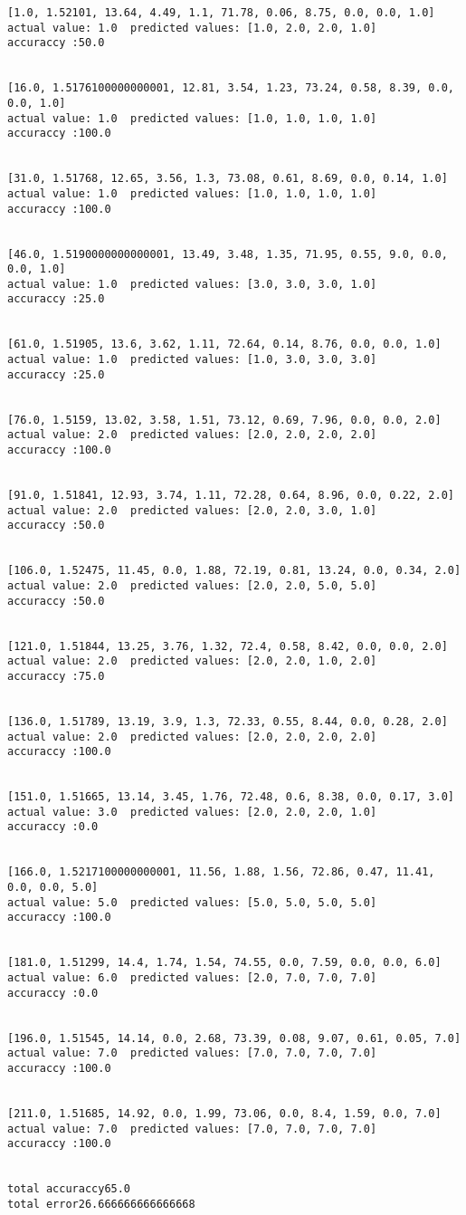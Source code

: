 \documentclass[11pt]{article}
\begin{document}
    \begin{Verbatim}[commandchars=\\\{\}]
[1.0, 1.52101, 13.64, 4.49, 1.1, 71.78, 0.06, 8.75, 0.0, 0.0, 1.0]
actual value: 1.0  predicted values: [1.0, 2.0, 2.0, 1.0]
accuraccy :50.0


[16.0, 1.5176100000000001, 12.81, 3.54, 1.23, 73.24, 0.58, 8.39, 0.0, 0.0, 1.0]
actual value: 1.0  predicted values: [1.0, 1.0, 1.0, 1.0]
accuraccy :100.0


[31.0, 1.51768, 12.65, 3.56, 1.3, 73.08, 0.61, 8.69, 0.0, 0.14, 1.0]
actual value: 1.0  predicted values: [1.0, 1.0, 1.0, 1.0]
accuraccy :100.0


[46.0, 1.5190000000000001, 13.49, 3.48, 1.35, 71.95, 0.55, 9.0, 0.0, 0.0, 1.0]
actual value: 1.0  predicted values: [3.0, 3.0, 3.0, 1.0]
accuraccy :25.0


[61.0, 1.51905, 13.6, 3.62, 1.11, 72.64, 0.14, 8.76, 0.0, 0.0, 1.0]
actual value: 1.0  predicted values: [1.0, 3.0, 3.0, 3.0]
accuraccy :25.0


[76.0, 1.5159, 13.02, 3.58, 1.51, 73.12, 0.69, 7.96, 0.0, 0.0, 2.0]
actual value: 2.0  predicted values: [2.0, 2.0, 2.0, 2.0]
accuraccy :100.0


[91.0, 1.51841, 12.93, 3.74, 1.11, 72.28, 0.64, 8.96, 0.0, 0.22, 2.0]
actual value: 2.0  predicted values: [2.0, 2.0, 3.0, 1.0]
accuraccy :50.0


[106.0, 1.52475, 11.45, 0.0, 1.88, 72.19, 0.81, 13.24, 0.0, 0.34, 2.0]
actual value: 2.0  predicted values: [2.0, 2.0, 5.0, 5.0]
accuraccy :50.0


[121.0, 1.51844, 13.25, 3.76, 1.32, 72.4, 0.58, 8.42, 0.0, 0.0, 2.0]
actual value: 2.0  predicted values: [2.0, 2.0, 1.0, 2.0]
accuraccy :75.0


[136.0, 1.51789, 13.19, 3.9, 1.3, 72.33, 0.55, 8.44, 0.0, 0.28, 2.0]
actual value: 2.0  predicted values: [2.0, 2.0, 2.0, 2.0]
accuraccy :100.0


[151.0, 1.51665, 13.14, 3.45, 1.76, 72.48, 0.6, 8.38, 0.0, 0.17, 3.0]
actual value: 3.0  predicted values: [2.0, 2.0, 2.0, 1.0]
accuraccy :0.0


[166.0, 1.5217100000000001, 11.56, 1.88, 1.56, 72.86, 0.47, 11.41, 0.0, 0.0, 5.0]
actual value: 5.0  predicted values: [5.0, 5.0, 5.0, 5.0]
accuraccy :100.0


[181.0, 1.51299, 14.4, 1.74, 1.54, 74.55, 0.0, 7.59, 0.0, 0.0, 6.0]
actual value: 6.0  predicted values: [2.0, 7.0, 7.0, 7.0]
accuraccy :0.0


[196.0, 1.51545, 14.14, 0.0, 2.68, 73.39, 0.08, 9.07, 0.61, 0.05, 7.0]
actual value: 7.0  predicted values: [7.0, 7.0, 7.0, 7.0]
accuraccy :100.0


[211.0, 1.51685, 14.92, 0.0, 1.99, 73.06, 0.0, 8.4, 1.59, 0.0, 7.0]
actual value: 7.0  predicted values: [7.0, 7.0, 7.0, 7.0]
accuraccy :100.0


total accuraccy65.0
total error26.666666666666668

    \end{Verbatim}
\end{document}
